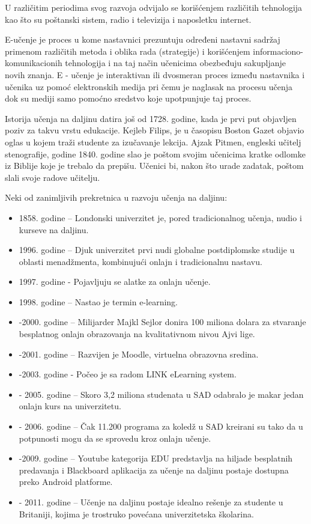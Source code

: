 \documentclass{article}
\begin{document}
U različitim periodima svog razvoja odvijalo se korišćenjem različitih tehnologija kao što su poštanski sistem, radio i televizija i naposletku internet.

E-učenje je proces u kome nastavnici prezuntuju određeni nastavni sadržaj primenom različitih metoda i oblika rada (strategije) i korišćenjem informaciono-komunikacionih tehnologija i na taj način učenicima obezbeđuju sakupljanje novih znanja. E - učenje je interaktivan ili dvosmeran proces između nastavnika i učenika uz pomoć elektronskih medija pri čemu je naglasak na procesu učenja dok su mediji samo pomoćno sredstvo koje upotpunjuje taj proces.

Istorija učenja na daljinu datira još od 1728. godine, kada je prvi put objavljen poziv za takvu vrstu edukacije. Kejleb Filips, je u časopisu Boston Gazet objavio oglas u kojem traži studente za izučavanje lekcija.
Ajzak Pitmen, engleski učitelj stenografije, godine 1840. godine slao je poštom svojim učenicima kratke odlomke iz Biblije koje je trebalo da prepišu. Učenici bi, nakon što urade zadatak, poštom slali svoje radove učitelju.

Neki od zanimljivih prekretnica u razvoju učenja na daljinu:
\begin{itemize}
    \item 1858. godine – Londonski univerzitet je, pored tradicionalnog učenja, nudio i kurseve na daljinu.
    \item 1996. godine – Djuk univerzitet prvi nudi globalne postdiplomske studije u oblasti menadžmenta, kombinujući onlajn i tradicionalnu nastavu.
    \item 1997. godine - Pojavljuju se alatke za onlajn učenje.
    \item 1998. godine – Nastao je termin e-learning.
    \item -2000. godine – Milijarder Majkl Sejlor donira 100 miliona dolara za stvaranje besplatnog onlajn obrazovanja na kvalitativnom nivou Ajvi lige.
    \item -2001. godine – Razvijen je Moodle, virtuelna obrazovna sredina.
    \item -2003. godine - Počeo je sa radom LINK eLearning system.
    \item - 2005. godine – Skoro 3,2 miliona studenata u SAD odabralo je makar jedan onlajn kurs na univerzitetu.
    \item - 2006. godine – Čak 11.200 programa za koledž u SAD kreirani su tako da u potpunosti mogu da se sprovedu kroz onlajn učenje.
    \item -2009. godine – Youtube kategorija EDU predstavlja na hiljade besplatnih predavanja i Blackboard aplikacija za učenje na daljinu postaje dostupna preko Android platforme.
    \item - 2011. godine – Učenje na daljinu postaje idealno rešenje za studente u Britaniji, kojima je trostruko povećana univerzitetska školarina.
\end{itemize}
\end{document}
